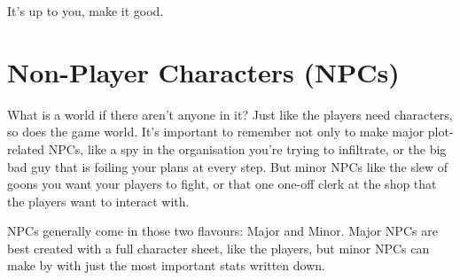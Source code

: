 It's up to you, make it good.

\section{Non-Player Characters (NPCs)}
What is a world if there aren't anyone in it?
Just like the players need characters, so does the game world.
It's important to remember not only to make major plot-related NPCs, like a spy in the organisation you're trying to infiltrate, or the big bad guy that is foiling your plans at every step.
But minor NPCs like the slew of goons you want your players to fight, or that one one-off clerk at the shop that the players want to interact with.

NPCs generally come in those two flavours: Major and Minor.
Major NPCs are best created with a full character sheet, like the players, but minor NPCs can make by with just the most important stats written down.
